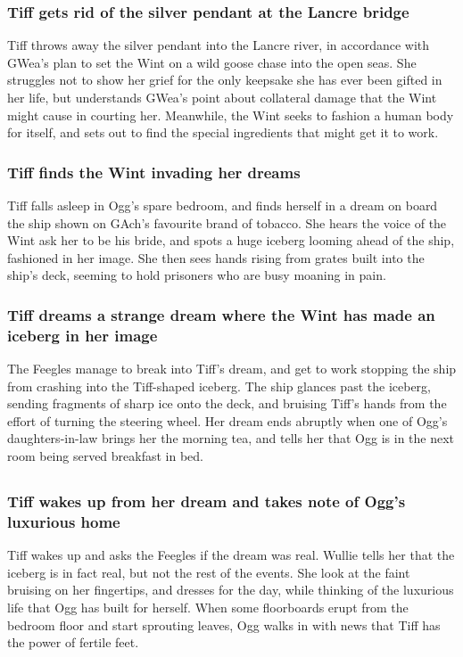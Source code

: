 \subsubsection{\Gls{Tiff} gets rid of the silver pendant at the Lancre bridge}
\Gls{Tiff} throws away the silver pendant into the Lancre river, in accordance with \Gls{GWea}'s
plan to set the \Gls{Wint} on a wild goose chase into the open seas. She struggles not to show her
grief for the only keepsake she has ever been gifted in her life, but understands \Gls{GWea}'s point
about collateral damage that the \Gls{Wint} might cause in courting her. Meanwhile, the \Gls{Wint}
seeks to fashion a human body for itself, and sets out to find the special ingredients that might
get it to work.

\subsubsection{\Gls{Tiff} finds the \Gls{Wint} invading her dreams}
\Gls{Tiff} falls asleep in \Gls{Ogg}'s spare bedroom, and finds herself in a dream on board the
ship shown on \Gls{GAch}'s favourite brand of tobacco. She hears the voice of the \Gls{Wint} ask her
to be his bride, and spots a huge iceberg looming ahead of the ship, fashioned in her image. She
then sees hands rising from grates built into the ship's deck, seeming to hold prisoners who are
busy moaning in pain.

\subsubsection{\Gls{Tiff} dreams a strange dream where the \Gls{Wint} has made an iceberg in her
    image}
The Feegles manage to break into \Gls{Tiff}'s dream, and get to work stopping the ship from crashing
into the \Gls{Tiff}-shaped iceberg. The ship glances past the iceberg, sending fragments of sharp
ice onto the deck, and bruising \Gls{Tiff}'s hands from the effort of turning the steering wheel.
Her dream ends abruptly when one of \Gls{Ogg}'s daughters-in-law brings her the morning tea, and
tells her that \Gls{Ogg} is in the next room being served breakfast in bed.

\subsection{}
\subsubsection{\Gls{Tiff} wakes up from her dream and takes note of \Gls{Ogg}'s luxurious home}
\Gls{Tiff} wakes up and asks the Feegles if the dream was real. \Gls{Wullie} tells her that the
iceberg is in fact real, but not the rest of the events. She look at the faint bruising on her
fingertips, and dresses for the day, while thinking of the luxurious life that \Gls{Ogg} has built
for herself. When some floorboards erupt from the bedroom floor and start sprouting leaves,
\Gls{Ogg} walks in with news that \Gls{Tiff} has the power of fertile feet.

